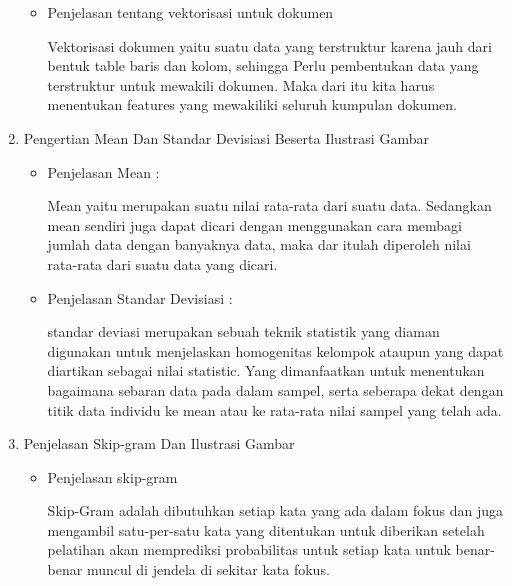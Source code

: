 \begin{enumerate}
\begin{itemize}
\item Penjelasan tentang vektorisasi untuk dokumen
\par Vektorisasi dokumen yaitu suatu data yang terstruktur karena jauh dari bentuk table baris dan kolom, sehingga Perlu pembentukan data yang terstruktur untuk mewakili dokumen. Maka dari itu kita harus menentukan features yang mewakiliki seluruh kumpulan dokumen.
\end{itemize}
\par
\par
\item Pengertian Mean Dan Standar Devisiasi Beserta Ilustrasi Gambar
\begin{itemize}
\item Penjelasan Mean :
\par Mean yaitu  merupakan suatu nilai rata-rata dari suatu data. Sedangkan mean sendiri juga  dapat dicari dengan menggunakan cara membagi jumlah data dengan banyaknya data, maka dar itulah diperoleh  nilai rata-rata dari suatu data yang dicari.
\par
\item Penjelasan Standar Devisiasi :
\par standar deviasi merupakan sebuah teknik statistik yang diaman digunakan untuk menjelaskan homogenitas kelompok ataupun yang dapat diartikan sebagai nilai statistic. Yang  dimanfaatkan untuk menentukan bagaimana sebaran data pada dalam sampel, serta seberapa dekat dengan  titik data individu ke mean atau  ke rata-rata nilai sampel yang telah ada.
\par
\end{itemize}
\par
\par
\item Penjelasan Skip-gram Dan Ilustrasi Gambar
\begin{itemize}
\item Penjelasan skip-gram
\par Skip-Gram adalah dibutuhkan setiap kata yang ada dalam fokus dan juga mengambil satu-per-satu kata yang ditentukan untuk diberikan setelah pelatihan akan memprediksi probabilitas untuk setiap kata untuk benar-benar muncul di jendela di sekitar kata fokus.
\par
\par
\end{itemize}
\par
\par
\par
\par
\end{enumerate}


